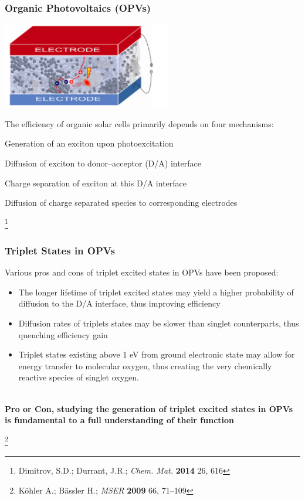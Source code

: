 \documentclass[usepdftitle=false,10pt]{beamer}
\newcommand{\cmark}{\color{green} \ding{51}}%
\newcommand{\xmark}{\color{red} \ding{55}}%
\newcommand{\done}{\rlap{$\square$}{\raisebox{2pt}{\large\hspace{1pt}\cmark}}%
\hspace{-2.5pt}}
\newcommand{\wontfix}{\rlap{$\square$}{\large\hspace{1pt}\xmark}}
\newcommand\blfootnote[1]{%
  \begingroup
  \renewcommand\thefootnote{}\footnote{#1}%
  \addtocounter{footnote}{-1}%
  \endgroup
}
\begin{document}
\begin{frame}
  \frametitle{\textbf{O}rganic \textbf{P}hoto\textbf{v}oltaics (OPVs)}
  \begin{center}
    \includegraphics[width=0.55\textwidth]{OPV}
  \end{center}
  The efficiency of organic solar cells primarily depends on four
  mechanisms:
  \begin{itemize}
    {\color{gray!40}\item[\ding{228}] Generation of an exciton upon photoexcitation}
    \item[\ding{228}] Diffusion of exciton to donor--acceptor (D/A) interface
    {\color{gray!40}\item[\ding{228}] Charge separation of exciton at this D/A interface}
    {\color{gray!40}\item[\ding{228}] Diffusion of charge separated species to corresponding electrodes}
  \end{itemize}
  \blfootnote{\tiny Dimitrov, S.D.; Durrant, J.R.; \emph{Chem. Mat.} \textbf{2014} 26, 616}
\end{frame}
\begin{frame}
  \frametitle{Triplet States in OPVs}

  Various pros and cons of triplet excited states in OPVs have been proposed:
  \begin{itemize}
    \item[\done] The longer lifetime of triplet excited states may yield a higher probability of diffusion
          to the D/A interface, thus improving efficiency
    \item[\wontfix] Diffusion rates of triplets states may be slower than singlet counterparts, thus quenching
          efficiency gain
    \item[\wontfix] Triplet states existing above 1 eV from ground electronic state may allow for energy transfer
          to molecular oxygen, thus creating the very chemically reactive species of singlet oxygen.
  \end{itemize}

  \begin{center}
  ~\\
  {\color{gray!10} \Large \bf Pro or Con, studying the generation of triplet excited states in OPVs is fundamental to a full understanding
  of their function}
  \end{center}

  \blfootnote{\tiny K\"{o}hler A.; B\"{a}ssler H.; \emph{MSER} \textbf{2009} 66, 71--109}
\end{frame}
\end{document}
